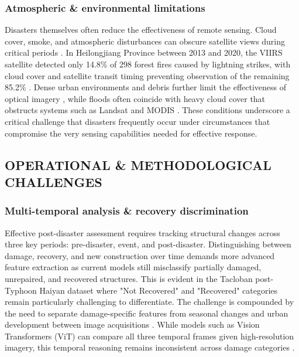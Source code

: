 \documentclass[conference,a4paper]{IEEEtran}
\begin{document}
\subsubsection{Atmospheric \& environmental limitations}
Disasters themselves often reduce the effectiveness of remote sensing. Cloud cover, smoke, and atmospheric disturbances can obscure satellite views during critical periods \cite{lagapEnhancingPostDisasterDamage2025}. In Heilongjiang Province between 2013 and 2020, the VIIRS satellite detected only 14.8\% of 298 forest fires caused by lightning strikes, with cloud cover and satellite transit timing preventing observation of the remaining 85.2\% \cite{jiaoForestFirePatterns2023}. Dense urban environments and debris further limit the effectiveness of optical imagery \cite{lagapEnhancingPostDisasterDamage2025}, while floods often coincide with heavy cloud cover that obstructs systems such as Landsat and MODIS \cite{teohExploringGenerativeAI2024}. These conditions underscore a critical challenge that disasters frequently occur under circumstances that compromise the very sensing capabilities needed for effective response.


\subsection{OPERATIONAL \& METHODOLOGICAL CHALLENGES}

\subsubsection{Multi-temporal analysis \& recovery discrimination}
Effective post-disaster assessment requires tracking structural changes across three key periods: pre-disaster, event, and post-disaster. Distinguishing between damage, recovery, and new construction over time demands more advanced feature extraction as current models still misclassify partially damaged, unrepaired, and recovered structures. This is evident in the Tacloban post-Typhoon Haiyan dataset where "Not Recovered" and "Recovered" categories remain particularly challenging to differentiate. The challenge is compounded by the need to separate damage-specific features from seasonal changes and urban development between image acquisitions \cite{kimDisasterAssessmentUsing2022}. While models such as Vision Transformers (ViT) can compare all three temporal frames given high-resolution imagery, this temporal reasoning remains inconsistent across damage categories \cite{lagapEnhancingPostDisasterDamage2025}.
\end{document}
